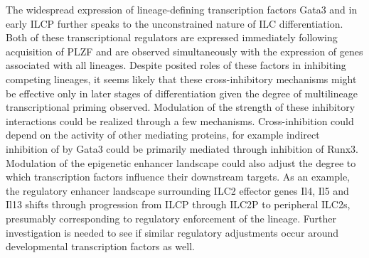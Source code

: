 The widespread expression of lineage-defining transcription factors Gata3 and \RORgt{} in early ILCP further speaks to the unconstrained nature of ILC differentiation. Both of these transcriptional regulators are expressed immediately following acquisition of PLZF and are observed simultaneously with the expression of genes associated with all lineages. Despite posited roles of these factors in inhibiting competing lineages, it seems likely that these cross-inhibitory mechanisms might be effective only in later stages of differentiation given the degree of multilineage transcriptional priming observed. Modulation of the strength of these inhibitory interactions could be realized through a few mechanisms. Cross-inhibition could depend on the activity of other mediating proteins, for example indirect inhibition of \RORgt{} by Gata3 could be primarily mediated through inhibition of Runx3. Modulation of the epigenetic enhancer landscape could also adjust the degree to which transcription factors influence their downstream targets. As an example, the regulatory enhancer landscape surrounding ILC2 effector genes Il4, Il5 and Il13 shifts through progression from ILCP through ILC2P to peripheral ILC2s, presumably corresponding to regulatory enforcement of the lineage. Further investigation is needed to see if similar regulatory adjustments occur around developmental transcription factors as well.

